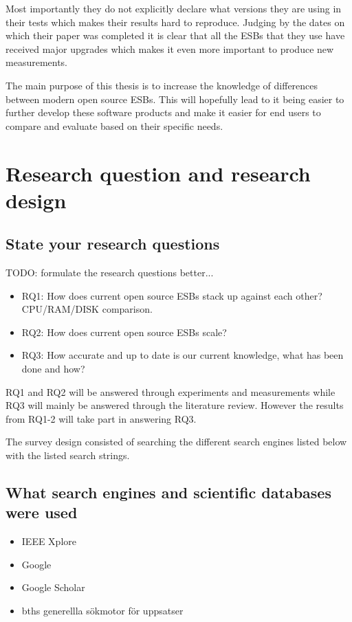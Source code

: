 \documentclass{llncs}
\begin{document}
Most importantly they do not explicitly declare what versions they are using in their tests which makes their results hard to reproduce. 
Judging by the dates on which their paper was completed it is clear that all the ESBs that they use have received major upgrades which makes it even more important to produce new measurements.

The main purpose of this thesis is to increase the knowledge of differences between modern open source ESBs. 
This will hopefully lead to it being easier to further develop these software products and make it easier for end users to compare and evaluate based on their specific needs.


\section{Research question and research design}
\subsection{State your research questions}
TODO: formulate the research questions better...
\begin{itemize}
	\item RQ1: How does current open source ESBs stack up against each other? CPU/RAM/DISK comparison.
	\item RQ2: How does current open source ESBs scale?
	\item RQ3: How accurate and up to date is our current knowledge, what has been done and how?
\end{itemize}
RQ1 and RQ2 will be answered through experiments and measurements while RQ3 will mainly be answered through the literature review. However the results from RQ1-2 will take part in answering RQ3.

The survey design consisted of searching the different search engines listed below with the listed search strings.

\subsection{What search engines and scientific databases were used}
\begin{itemize}
	\item IEEE Xplore
	\item Google
	\item Google Scholar
	\item bths generellla sökmotor för uppsatser
\end{itemize}
\end{document}

